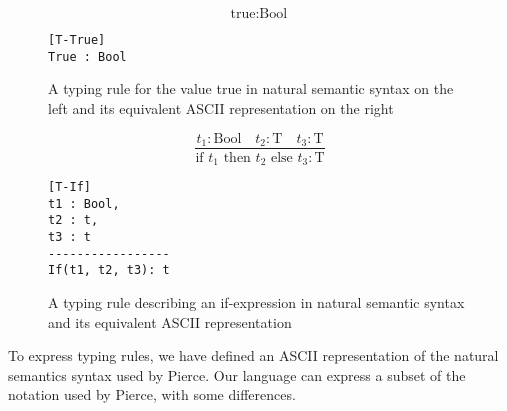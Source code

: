 \documentclass[nofilelist]{cslthse-msc}
\begin{document}
\begin{figure}[]
\centering
\begin{minipage}{.45\textwidth}
  \centering
  \begin{equation}
    \tag{T-True}
    \text{true} : \text{Bool}
  \end{equation}
\end{minipage}%
\hspace{.1\textwidth}\begin{minipage}{.45\textwidth}
  \centering
\begin{lstlisting}[]
[T-True]
True : Bool
\end{lstlisting}
\end{minipage}
\caption{A typing rule for the value true in natural semantic syntax on the left and its equivalent ASCII representation on the right}
\label{trexampletrue}
\end{figure}
\begin{figure}[]
\centering
\begin{minipage}{.45\textwidth}
  \centering
  \begin{equation}
    \tag{T-If}
    \frac{
      t_1 : \text{Bool}\quad
      t_2 : \text{T}\quad
      t_3 : \text{T}
    }{
      \text{if } t_1 \text{ then } t_2 \text{ else } t_3 : \text{T}
    }
  \end{equation}
\end{minipage}%
\hspace{.1\textwidth}\begin{minipage}{.45\textwidth}
  \centering
\begin{lstlisting}[]
[T-If]
t1 : Bool,
t2 : t,
t3 : t
-----------------
If(t1, t2, t3): t
\end{lstlisting}
\end{minipage}
\caption{A typing rule describing an if-expression in natural semantic syntax and its equivalent ASCII representation}
\label{trexampleif}
\end{figure}


To express typing rules, we have defined an ASCII representation of the natural semantics syntax used by Pierce\cite{Pierce}.
Our language can express a subset of the notation used by Pierce, with some differences.
\end{document}
